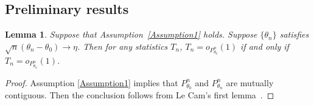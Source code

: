 \documentclass[11pt]{article}
\newcommand{\myT}{\intercal}
\theoremstyle{plain}
\newtheorem{lemma}{\quad\quad Lemma}
\theoremstyle{definition}
\theoremstyle{remark}
\begin{document}
\begin{appendices}



\section{Preliminary results}
\begin{lemma}
        Suppose that Assumption~\ref{Assumption1} holds.
        Suppose $\{\theta_n\}$ satisfies $\sqrt{n}(\theta_n-\theta_0)\to \eta$.
        Then for any statistics $T_n$, $T_n = o_{P_{\theta_0}^n}(1)$ if and only if $T_n = o_{P_{\theta_n}^n}(1)$.
    \label{lemma:contiguous}
\end{lemma}
\begin{proof}
    Assumption \ref{Assumption1} implies that $P_{\theta_0}^n$ and $P_{\theta_n}^n$ are mutually contiguous. 
    Then the conclusion follows from Le Cam's first lemma~\citep[Lemma 6.4]{van2000asymptotic}.
\end{proof}


\end{appendices}
\end{document}
